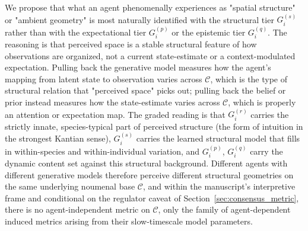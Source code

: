 \documentclass[11pt]{article}
\begin{document}
We propose that what an agent phenomenally experiences as "spatial structure" or "ambient geometry" is most naturally identified with the structural tier $G_i^{(s)}$ rather than with the expectational tier $G_i^{(p)}$ or the epistemic tier $G_i^{(q)}$. The reasoning is that perceived space is a stable structural feature of how observations are organized, not a current state-estimate or a context-modulated expectation. Pulling back the generative model measures how the agent's mapping from latent state to observation varies across $\mathcal{C}$, which is the type of structural relation that "perceived space" picks out; pulling back the belief or prior instead measures how the state-estimate varies across $\mathcal{C}$, which is properly an attention or expectation map. The graded reading is that $G_i^{(r)}$ carries the strictly innate, species-typical part of perceived structure (the form of intuition in the strongest Kantian sense), $G_i^{(s)}$ carries the learned structural model that fills in within-species and within-individual variation, and $G_i^{(p)}$, $G_i^{(q)}$ carry the dynamic content set against this structural background. Different agents with different generative models therefore perceive different structural geometries on the same underlying noumenal base $\mathcal{C}$, and within the manuscript's interpretive frame and conditional on the regulator caveat of Section~\ref{sec:consensus_metric}, there is no agent-independent metric on $\mathcal{C}$, only the family of agent-dependent induced metrics arising from their slow-timescale model parameters.
\end{document}
